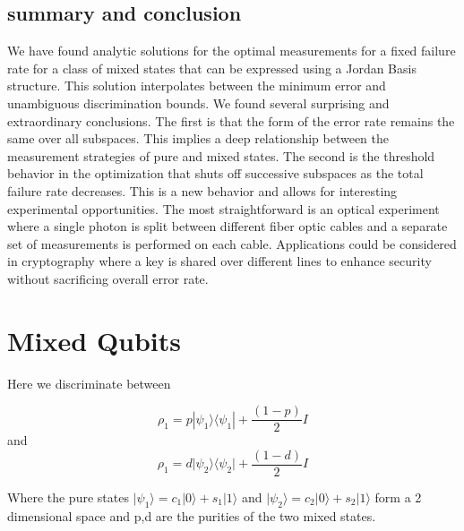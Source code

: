 \documentclass[12pt,oneside,english,reqno]{amsbook}
\numberwithin{section}{chapter}
\numberwithin{equation}{section}
\numberwithin{figure}{section}
\newcommand{\br}[1]{\langle #1|}
\newcommand{\ke}[1]{|#1\rangle}
\begin{document}
\fi

\section{summary and conclusion} 
  
We have found analytic solutions for the optimal measurements for a fixed failure rate for a class of mixed states that can be expressed using a Jordan Basis structure.  This solution interpolates between the minimum error and unambiguous discrimination bounds.  We found several surprising and extraordinary conclusions.  The first is that the form of the error rate remains the same over all subspaces.  This implies a deep relationship between the measurement strategies of pure and mixed states. The second is the threshold behavior in the optimization that shuts off successive subspaces as the total failure rate decreases.  This is a new behavior and allows for interesting experimental opportunities.  The most straightforward is an optical experiment where a single photon is split between different fiber optic cables and a separate set of measurements is performed on each cable.  Applications could be considered in cryptography where a key is shared over different lines to enhance security without sacrificing overall error rate.



\chapter{Mixed Qubits}

Here we discriminate between

\[ \rho_1 = p \ke {\psi_1} \br {\psi_1}  + \frac{(1-p)}{2} I\] 
and
\[ \rho_1 = d \vert \psi_2 \rangle \langle \psi_2 \vert + \frac{(1-d)}{2} I\]

Where the pure states $\vert \psi_1 \rangle = c_1 \vert 0 \rangle + s_1 \vert 1 \rangle $ and $\vert \psi_2 \rangle = c_2 \vert 0 \rangle + s_2 \vert 1 \rangle $ form a 2 dimensional space and p,d are the purities of the two mixed states.
\end{document}
